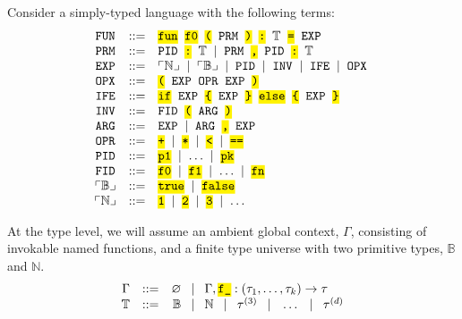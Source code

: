\documentclass[sigplan,nonacm]{acmart}\settopmatter{printfolios=false,printccs=false,printacmref=false}
\newcommand{\codett}[1]{\texttt{\hl{#1}}}
\begin{document}
Consider a simply-typed language with the following terms:
  \newcommand{\nt}[1]{\texttt{#1}}      %
  \newcommand{\tok}[1]{\codett{#1}}     %
  \newcommand{\gap}{\;\;}                 %
  \[
    \hspace{-0.1cm}\begin{array}{ccl}
      \nt{FUN} & ::= & \tok{fun}\gap \tok{f0}\gap \tok{(}\gap \nt{PRM}\gap \tok{)}\gap \tok{:}\gap \mathbb{T} \gap \tok{=}\gap \nt{EXP} \\
      \nt{PRM} & ::= & \nt{PID}\gap \tok{:}\gap \mathbb{T} \;\mid\; \nt{PRM}\gap \tok{,}\gap \nt{PID}\gap \tok{:}\gap \mathbb{T} \\
      \nt{EXP} & ::= & \ulcorner\mathbb{N}\lrcorner \;\mid\; \ulcorner\mathbb{B}\lrcorner \;\mid\; \nt{PID} \;\mid\; \nt{INV} \;\mid\; \nt{IFE} \;\mid\; \nt{OPX}\\
      \nt{OPX} & ::= & \codett{(}\gap\nt{EXP}\gap \nt{OPR}\gap \nt{EXP}\gap\codett{)} \\
      \nt{IFE} & ::= & \tok{if}\gap \nt{EXP}\gap \tok{\{}\gap \nt{EXP}\gap \tok{\}}\gap
      \tok{else}\gap \tok{\{}\gap \nt{EXP}\gap \tok{\}} \\
      \nt{INV} & ::= & \nt{FID}\gap \tok{(}\gap \nt{ARG}\gap \tok{)} \\
      \nt{ARG} & ::= & \nt{EXP} \;\mid\; \nt{ARG}\gap \tok{,}\gap \nt{EXP} \\
      \nt{OPR} & ::= & \tok{+} \;\mid\; \tok{*} \;\mid\; \tok{<} \;\mid\; \tok{==} \\
      \nt{PID} & ::= & \tok{p1} \;\mid\; \ldots \;\mid\; \tok{pk} \\
      \nt{FID} & ::= & \tok{f0} \;\mid\; \tok{f1} \;\mid\; \ldots \;\mid\; \tok{fn}\\
      \ulcorner\mathbb{B}\lrcorner & ::= & \tok{true} \;\mid\; \tok{false}\\
      \ulcorner\mathbb{N}\lrcorner & ::= & \tok{1} \;\mid\; \tok{2} \;\mid\; \tok{3} \;\mid\; \ldots
    \end{array}
  \]

  \noindent At the type level, we will assume an ambient global context, $\Gamma$, consisting of invokable named functions, and a finite type universe with two primitive types, $\mathbb{B}$ and $\mathbb{N}$.
  \[
    \begin{array}{rcl}
      \Gamma & ::= & \varnothing \texttt{ }\mid \texttt{ }\Gamma, \codett{f\_} : (\tau_{1}, \ldots, \tau_{k}) \rightarrow \tau\\
      \mathbb{T} & ::= & \hspace{0.039cm}\mathbb{B}\texttt{ } \mid \texttt{ }\mathbb{N}\texttt{ } \mid \texttt{ }\tau^{(3)}\texttt{ } \mid \texttt{ }\ldots\texttt{ }\mid \texttt{ }\tau^{(d)}
    \end{array}
  \]
\end{document}

